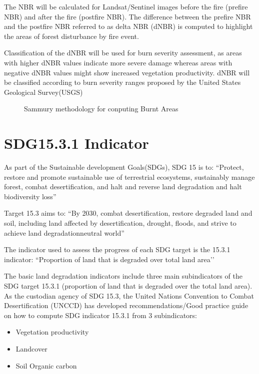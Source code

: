 \documentclass[letterpaper,10pt,english]{sphinxmanual}
\let\sphinxpxdimen\pdfpxdimen\else\newdimen\sphinxpxdimen
\begin{document}
\sphinxAtStartPar
The NBR will be calculated for Landsat/Sentinel images before the fire (pre\sphinxhyphen{}fire NBR) and after the fire (post\sphinxhyphen{}fire NBR). The difference between the pre\sphinxhyphen{}fire NBR and the post\sphinxhyphen{}fire NBR referred to as delta NBR (dNBR) is computed to highlight the areas of forest disturbance by fire event.

\sphinxAtStartPar
Classification of the dNBR will be used for burn severity assessment, as areas with higher dNBR values indicate more severe damage whereas areas with negative dNBR values might show increased vegetation productivity. dNBR will be classified according to burn severity ranges proposed by the United States Geological Survey(USGS)

\begin{figure}[H]
\centering
\capstart

\noindent\sphinxincludegraphics[width=550\sphinxpxdimen,height=300\sphinxpxdimen]{{Forest_fires}.png}
\caption{Sammury methodology for conputing Burnt Areas}\label{\detokenize{Background/LD_indicators:id6}}\end{figure}

\sphinxstepscope


\chapter{SDG15.3.1 Indicator}
\label{\detokenize{Background/SDG_indicators:sdg15-3-1-indicator}}\label{\detokenize{Background/SDG_indicators::doc}}
\sphinxAtStartPar
As part of the Sustainable development Goals(SDGs), SDG 15 is to: “Protect, restore and promote sustainable use of terrestrial ecosystems, sustainably manage forest, combat desertification, and halt and reverse land degradation and halt biodiversity loss”

\sphinxAtStartPar
Target 15.3 aims to: “By 2030, combat desertification, restore degraded land and soil, including land affected by desertification, drought, floods, and strive to achieve land degradation\sphinxhyphen{}neutral world”

\sphinxAtStartPar
The indicator used to assess the progress of each SDG target is the 15.3.1 indicator: “Proportion of land that is degraded over total land area’’

\sphinxAtStartPar
The basic land degradation indicators include three main sub\sphinxhyphen{}indicators of the SDG target 15.3.1 (proportion of land that is degraded over the total land area). As the custodian agency of SDG 15.3, the United Nations Convention to Combat Desertification (UNCCD) has developed recommendations/Good practice guide on how to compute SDG indicator 15.3.1  from 3 sub\sphinxhyphen{}indicators:
\begin{itemize}
\item {} 
\sphinxAtStartPar
Vegetation productivity

\item {} 
\sphinxAtStartPar
Landcover

\item {} 
\sphinxAtStartPar
Soil Organic carbon

\end{itemize}
\end{document}
